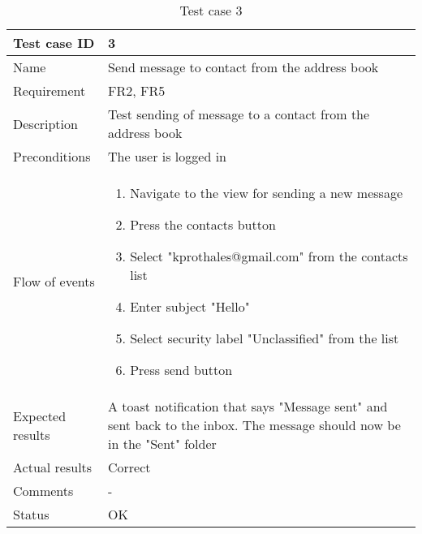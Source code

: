 		\begin{table}[htb]
			\begin{tabular}{l|p{10cm}}
				Test case ID & 3 \\ \hline
				Name & Send message to contact from the address book\\ \hline
				Requirement & FR2, FR5\\ \hline
				Description & Test sending of message to a contact from the address book\\ \hline
				Preconditions & The user is logged in\\ \hline
				Flow of events & 
					\begin{enumerate}
						\item{}Navigate to the view for sending a new message
						\item{}Press the contacts button
						\item{}Select "kprothales@gmail.com" from the contacts list
						\item{}Enter subject "Hello"
						\item{}Select security label "Unclassified" from the list
						\item{}Press send button
					\end{enumerate} \\ \hline
				Expected results & A toast notification that says "Message sent" and sent back to the inbox. The message 					should now be in the "Sent" folder\\ \hline
				Actual results & Correct\\ \hline
				Comments & -\\ \hline
				Status & OK\\ \hline
			\end{tabular}
			\caption{Test case 3} \label{tab:case3}
		\end{table}

